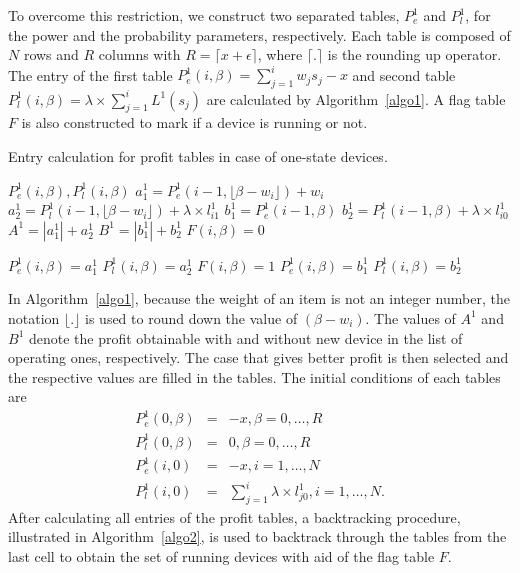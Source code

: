 To overcome this restriction, we construct two separated tables, $P^1_e$ and $P^1_l$, for the power and the probability parameters, respectively. Each table is composed of $N$ rows and $R$ columns with $R=\lceil x+\epsilon\rceil$, where $\lceil . \rceil$ is the rounding up operator. The entry of the first table $P^1_e(i,\beta)=\sum_{j=1}^i{w_js_j-x}$ and second table $P^1_l(i,\beta)=\lambda \times \sum_{j=1}^i{L^1(s_j)}$ are calculated by Algorithm~\ref{algo1}. A flag table $F$ is also constructed to mark if a device is running or not.
\begin{algorithm}
\caption{Entry calculation for profit tables in case of one-state devices.}
\label{algo1}
\begin{algorithmic}[1]
\Ensure $P^1_e(i,\beta),P^1_l(i,\beta)$
\State $a^1_1 = P^1_e(i-1,\lfloor \beta-w_i\rfloor)+w_i$
\State $a^1_2 = P^1_l(i-1,\lfloor \beta-w_i\rfloor)+\lambda \times l^1_{i1}$
\State $b^1_1 = P^1_e(i-1,\beta)$
\State $b^1_2 = P^1_l(i-1,\beta)+\lambda \times l^1_{i0}$
\State $A^1 =  \left |a^1_1\right|+a^1_2$
\State $B^1 = \left |b^1_1\right |+b^1_2$
\State $F(i,\beta) = 0$

  \State $P^1_e(i,\beta) =  a^1_1$
  \State $P^1_l(i,\beta) = a^1_2$
  \State $F(i,\beta) = 1$
\Else
  \State $P^1_e(i,\beta)= b^1_1$
  \State $P^1_l(i,\beta)= b^1_2$
\EndIf
\end{algorithmic}
\end{algorithm}
In Algorithm~\ref{algo1}, because the weight of an item is not an integer number, the notation $\lfloor . \rfloor$ is used to round down the value of $(\beta-w_i)$. The values of $A^1$ and $B^1$ denote the profit obtainable with and without new device in the list of operating ones, respectively. The case that gives better profit is then selected and the respective values are filled in the tables. The initial conditions of each tables are
\begin{eqnarray*}
P^1_e(0,\beta)& =&-x,\beta = 0,\ldots, R\\
P^1_l(0,\beta)& = &0,  \beta = 0,\ldots,R\\
P^1_e(i,0)&=& -x,i=1,\ldots,N\\
P^1_l(i,0) &= &\sum_{j=1}^i{\lambda \times l^1_{j0}},i=1,\ldots,N.
\end{eqnarray*}
After calculating all entries of the profit tables, a backtracking procedure, illustrated in Algorithm~\ref{algo2}, is used to backtrack through the tables from the last cell to obtain the set of running devices with aid of the flag table $F$.

